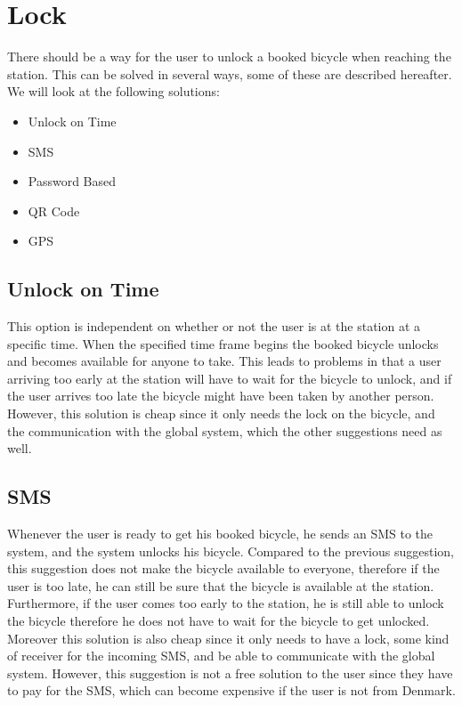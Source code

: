 \section{Lock}\label{sec:Lock}
There should be a way for the user to unlock a booked bicycle when reaching the station.
This can be solved in several ways, some of these are described hereafter.
We will look at the following solutions:

\begin{itemize}
	\item Unlock on Time
	\item SMS
	\item Password Based
	\item QR Code
	\item GPS
\end{itemize}

\subsection{Unlock on Time}
This option is independent on whether or not the user is at the station at a specific time.
When the specified time frame begins the booked bicycle unlocks and becomes available for anyone to take.
This leads to problems in that a user arriving too early at the station will have to wait for the bicycle to unlock, and if the user arrives too late the bicycle might have been taken by another person.
However, this solution is cheap since it only needs the lock on the bicycle, and the communication with the global system, which the other suggestions need as well.

\subsection{SMS}
Whenever the user is ready to get his booked bicycle, he sends an SMS to the system, and the system unlocks his bicycle.
Compared to the previous suggestion, this suggestion does not make the bicycle available to everyone, therefore if the user is too late, he can still be sure that the bicycle is available at the station.
Furthermore, if the user comes too early to the station, he is still able to unlock the bicycle therefore he does not have to wait for the bicycle to get unlocked.
Moreover this solution is also cheap since it only needs to have a lock, some kind of receiver for the incoming SMS, and be able to communicate with the global system.
However, this suggestion is not a free solution to the user since they have to pay for the SMS, which can become expensive if the user is not from Denmark.

